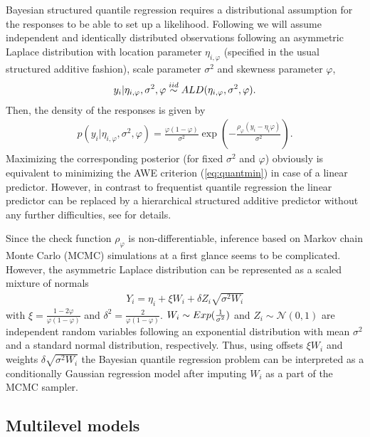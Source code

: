 \documentclass[11pt,a4paper,twoside]{bayesxarticle}
\begin{document}
Bayesian structured quantile regression requires a distributional assumption for the responses to be able to set up a likelihood. Following  we will assume independent and identically distributed observations following an asymmetric Laplace distribution with location parameter $\eta_{i,\varphi}$ (specified in the usual structured additive fashion), scale parameter $\sigma^2$ and skewness parameter $\varphi$,
\begin{align*}
y_{i} | \eta_{i,\varphi}, \sigma^2, \varphi \overset{\textnormal{iid}}{\sim} \textnormal{ALD}(\eta_{i,\varphi},\sigma^2,\varphi).
\end{align*}
Then, the density of the responses is given by
\begin{align*}
p(y_i | \eta_{i,\varphi},\sigma^2,\varphi) = \frac{\varphi(1-\varphi)}{\sigma^2} \exp\left(-\frac{\rho_{\varphi}(y_i - \eta_i{\varphi})}{\sigma^2}\right).
\end{align*}
Maximizing the corresponding posterior (for fixed $\sigma^2$ and $\varphi$) obviously is equivalent to minimizing the AWE criterion (\ref{eq:quantmin}) in case of a linear predictor. However, in contrast to frequentist quantile regression the linear predictor can be replaced by a hierarchical structured additive predictor without any further difficulties, see  for details.

Since the check function $\rho_{\varphi}$ is non-differentiable, inference based on Markov chain Monte Carlo (MCMC) simulations at a first glance seems to be complicated. However, the asymmetric Laplace distribution can be represented as a scaled mixture of normals
\begin{align*}
Y_i = \eta_i + \xi W_i + \delta Z_i \sqrt{\sigma^2 W_i}
\end{align*}
with $\xi = \frac{1-2\varphi}{\varphi(1-\varphi)}$ and $\delta^2 = \frac{2}{\varphi(1-\varphi)}$.  $W_i \sim \textnormal{Exp}(\frac{1}{\sigma^2})$ and $Z_i \sim \mathcal{N}(0,1)$ are independent random variables following an exponential distribution with mean $\sigma^2$ and a standard normal distribution, respectively. Thus, using offsets $\xi W_i$ and weights $\delta \sqrt{\sigma^2 W_i}$ the Bayesian quantile regression problem can be interpreted as a conditionally Gaussian regression model after imputing $W_i$ as a part of the MCMC sampler.


\subsection{Multilevel models}
\end{document}
